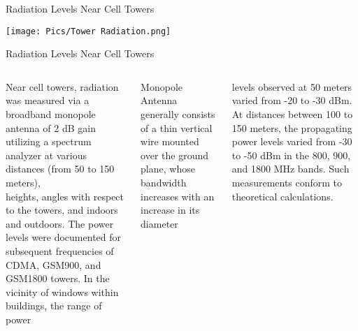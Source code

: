 \documentclass[7pt, aspectratio=169]{beamer}
\begin{document}
\begin{frame}{Radiation Levels Near Cell Towers}
\begin{center}
    \texttt{[image: Pics/Tower Radiation.png]}
\end{center}
    
\end{frame}
\begin{frame}{Radiation Levels Near Cell Towers}
\begin{columns}
    Near cell towers, radiation was measured via a broadband monopole antenna of 2 dB gain utilizing a spectrum analyzer at various distances (from 50 to 150 meters),\\
    \vspace{0.1cm}
    heights, angles with respect to the towers, and indoors and outdoors. The power levels were documented for subsequent frequencies of CDMA, GSM900, and GSM1800 towers. In the vicinity of windows within buildings, the range of power\autocite{kumar2009biological}
    
    \begin{block}{Monopole Antenna}
        generally consists of a thin vertical wire mounted over the ground plane, whose bandwidth increases with an increase in its diameter
    \end{block}
     levels observed at 50 meters varied from -20 to -30 dBm. At distances between 100 to 150 meters, the propagating power levels varied from -30 to -50 dBm in the 800, 900, and 1800 MHz bands. Such measurements conform to theoretical calculations.

    
\end{columns}
    
\end{frame}
\end{document}
